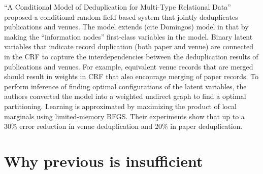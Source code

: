 \documentclass[]{article}
\begin{document}
``A Conditional Model of Deduplication for Multi-Type Relational Data'' proposed a conditional random field based system that jointly deduplicates publications and venues.  The model extends (cite Domingos) model in that by making the ``information nodes'' first-class variables in the model.  Binary latent variables that indicate record duplication (both paper and venue) are connected in the CRF to capture the interdependencies between the deduplication results of publications and venues.  For example, equivalent venue records that are merged should result in weights in CRF that also encourage merging of paper records.  To perform inference of finding optimal configurations of the latent variables, the authors converted the model into a weighted undirect graph to find a optimal partitioning.  Learning is approximated by maximizing the product of local marginals using limited-memory BFGS.  Their experiments show that up to a 30\% error reduction in venue deduplication and 20\% in paper deduplication.


\section{Why previous is insufficient} %
\label{sec:why_previous_is_insufficient}




\end{document}
